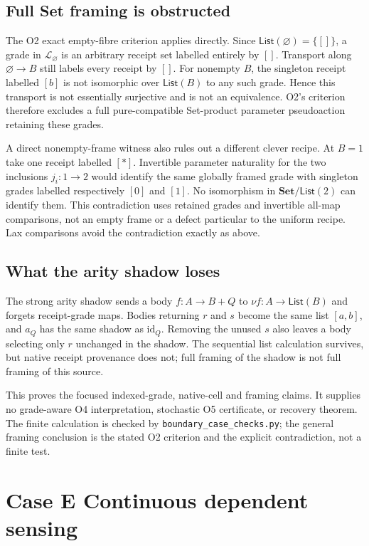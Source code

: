 \documentclass[11pt,a4paper]{article}
\theoremstyle{definition}
\newcommand{\Set}{\mathbf{Set}}
\newcommand{\List}{\mathsf{List}}
\newcommand{\id}{\mathrm{id}}
\begin{document}
\subsection{Full Set framing is obstructed}
The O2 exact empty-fibre criterion applies directly. Since
$\List(\varnothing)=\{[]\}$, a grade in $\mathcal L_\varnothing$ is
an arbitrary receipt set labelled entirely by $[]$. Transport along
$\varnothing\to B$ still labels every receipt by $[]$. For nonempty
$B$, the singleton receipt labelled $[b]$ is not isomorphic over
$\List(B)$ to any such grade. Hence this transport is not essentially
surjective and is not an equivalence. O2's criterion therefore excludes
a full pure-compatible Set-product parameter pseudoaction retaining
these grades.

A direct nonempty-frame witness also rules out a different clever recipe.
At $B=1$ take one receipt labelled $[*]$. Invertible parameter naturality
for the two inclusions $j_i:1\to2$ would identify the same globally
framed grade with singleton grades labelled respectively $[0]$ and $[1]$.
No isomorphism in $\Set/\List(2)$ can identify them. This contradiction
uses retained grades and invertible all-map comparisons, not an empty
frame or a defect particular to the uniform recipe. Lax comparisons
avoid the contradiction exactly as above.

\subsection{What the arity shadow loses}
The strong arity shadow sends a body $f:A\to B+Q$ to
$\nu f:A\to\List(B)$ and forgets receipt-grade maps. Bodies returning
$r$ and $s$ become the same list $[a,b]$, and $a_Q$ has the same shadow
as $\id_Q$. Removing the unused $s$ also leaves a body selecting only
$r$ unchanged in the shadow. The sequential list calculation survives,
but native receipt provenance does not; full framing of the shadow is
not full framing of this source.

This proves the focused indexed-grade, native-cell and framing claims.
It supplies no grade-aware O4 interpretation, stochastic O5 certificate,
or recovery theorem. The finite calculation is checked by
\texttt{boundary\_case\_checks.py}; the general framing conclusion is
the stated O2 criterion and the explicit contradiction, not a finite test.


\section{Case E Continuous dependent sensing}\label{sec:caseE}
\end{document}
